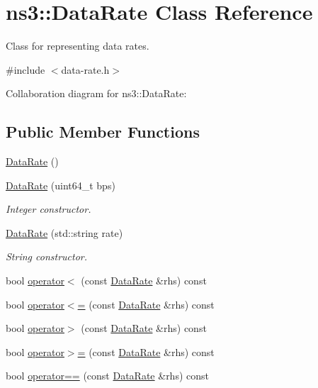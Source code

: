 \hypertarget{classns3_1_1DataRate}{}\section{ns3\+:\+:Data\+Rate Class Reference}
\label{classns3_1_1DataRate}


Class for representing data rates.  




{\ttfamily \#include $<$data-\/rate.\+h$>$}



Collaboration diagram for ns3\+:\+:Data\+Rate\+:
\subsection*{Public Member Functions}
\begin{DoxyCompactItemize}
\item 
\hyperlink{classns3_1_1DataRate_abe139e6335e5ad820d35b24da7f06325}{Data\+Rate} ()
\item 
\hyperlink{classns3_1_1DataRate_ae21aff52e46c14e3ee851d9fe3010222}{Data\+Rate} (uint64\+\_\+t bps)
\begin{DoxyCompactList}\small\item\em Integer constructor. \end{DoxyCompactList}\item 
\hyperlink{classns3_1_1DataRate_a6d5dd08beb900977abaa4599f603c846}{Data\+Rate} (std\+::string rate)
\begin{DoxyCompactList}\small\item\em String constructor. \end{DoxyCompactList}\item 
bool \hyperlink{classns3_1_1DataRate_a02486461957663649743f355eb68b4be}{operator$<$} (const \hyperlink{classns3_1_1DataRate}{Data\+Rate} \&rhs) const 
\item 
bool \hyperlink{classns3_1_1DataRate_a1d2510ccc65d9f92581f11510abee4ad}{operator$<$=} (const \hyperlink{classns3_1_1DataRate}{Data\+Rate} \&rhs) const 
\item 
bool \hyperlink{classns3_1_1DataRate_a8cb55959de3d8eb3ecf31a77def8852e}{operator$>$} (const \hyperlink{classns3_1_1DataRate}{Data\+Rate} \&rhs) const 
\item 
bool \hyperlink{classns3_1_1DataRate_a3a2ee6fd73a1844060f4c78381806ea7}{operator$>$=} (const \hyperlink{classns3_1_1DataRate}{Data\+Rate} \&rhs) const 
\item 
bool \hyperlink{classns3_1_1DataRate_a0eca0eafe46a9887bc91eb1917be66c9}{operator==} (const \hyperlink{classns3_1_1DataRate}{Data\+Rate} \&rhs) const 

\end{DoxyCompactItemize}
